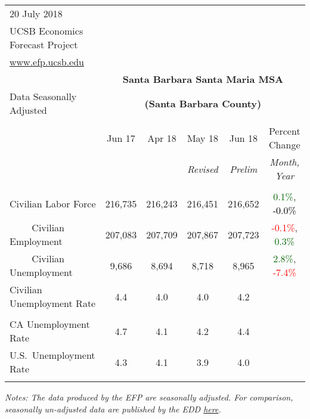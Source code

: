\documentclass[12pt]{article}
\begin{document}
\begin{table}
\begin{tabular}{|l|c|c|c|c|c|}
\multicolumn{1}{l}{\small 20 July 2018} & \multicolumn{5}{c}{} \\
\multicolumn{1}{l}{\small UCSB Economics Forecast Project} & \multicolumn{5}{c}{} \\
\multicolumn{1}{l}{\small \href{http://www.efp.ucsb.edu/}{www.efp.ucsb.edu}} & \multicolumn{5}{c}{} \\
\multicolumn{1}{c}{} & \multicolumn{5}{c}{\large \textbf{Santa Barbara Santa Maria MSA}} \\
\multicolumn{1}{l}{\small Data Seasonally Adjusted} & \multicolumn{5}{c}{\small \textbf{(Santa Barbara County)}} \\ \hline \hline
& & & & & \\
 & Jun 17 & Apr 18 & May 18 & Jun 18 & Percent Change \\
 & & & \small \textit{Revised} & \small \textit{Prelim} & \small \textit{Month, Year} \\ \hline
& & & & & \\
Civilian Labor Force & 216,735 & 216,243 & 216,451 & 216,652 & \textcolor{darkgreen}{0.1\%}, \textcolor{black}{-0.0\%} \\
$\qquad$ \small Civilian Employment & 207,083 & 207,709 & 207,867 & 207,723 & \textcolor{red}{-0.1\%}, \textcolor{darkgreen}{0.3\%} \\
$\qquad$ \small Civilian Unemployment & 9,686 & 8,694 & 8,718 & 8,965 & \textcolor{darkgreen}{2.8\%}, \textcolor{red}{-7.4\%} \\
Civilian Unemployment Rate & 4.4 & 4.0 & 4.0 & 4.2 & \\
& & & & & \\
CA Unemployment Rate & 4.7 & 4.1 & 4.2 & 4.4 & \\
U.S.\ Unemployment Rate & 4.3 & 4.1 & 3.9 & 4.0 & \\
& & & & & \\ \hline \hline
\end{tabular}
\par
\vspace{.5em}
\footnotesize
\textit{Notes: The data produced by the EFP are seasonally adjusted. For comparison, seasonally un-adjusted data are published by the EDD \href{http://www.labormarketinfo.ca.gov/file/lfmonth/satb$pds.pdf}{here}.}
\end{table}
\end{document}

